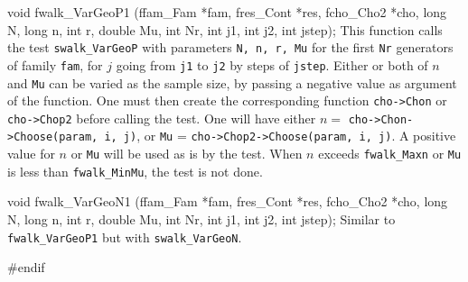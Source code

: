 void fwalk_VarGeoP1 (ffam_Fam *fam, fres_Cont *res, fcho_Cho2 *cho,
                     long N, long n, int r, double Mu,
                     int Nr, int j1, int j2, int jstep);
\endcode
\tab
  This function calls the test {\tt swalk\_VarGeoP} with
  parameters {\tt N, n, r, Mu} for the first {\tt Nr} generators of
  family {\tt fam}, for $j$ going from {\tt j1} to {\tt j2} by steps of
  {\tt jstep}. Either or both of $n$ and {\tt Mu} can be varied as
  the sample size, by passing a negative value as argument of the
  function. One must then create the corresponding function
  {\tt cho->Chon} or {\tt cho->Chop2} before calling the test.
  One will have either $n = {}$ {\tt cho->Chon->Choose(param, i, j)},
  or  {\tt Mu} = {\tt cho->Chop2->Choose(param, i, j)}. A positive value
  for $n$ or {\tt Mu} will be used as is by the test. When $n$ exceeds
  {\tt fwalk\_Maxn} or {\tt Mu} is less than {\tt fwalk\_MinMu},
  the test is not done.
\endtab
\code


void fwalk_VarGeoN1 (ffam_Fam *fam, fres_Cont *res, fcho_Cho2 *cho,
                     long N, long n, int r, double Mu,
                     int Nr, int j1, int j2, int jstep);
\endcode
\tab Similar to {\tt fwalk\_VarGeoP1} but with {\tt swalk\_VarGeoN}.
\endtab

\code
\hide
#endif
\endhide
\endcode
